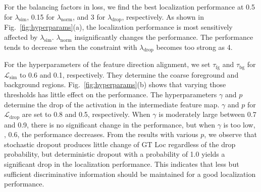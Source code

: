 For the balancing factors in loss, we find the best localization performance at 0.5 for $\lambda_\text{sim}$, 0.15 for $\lambda_\text{norm}$, and 3 for $\lambda_\text{drop}$, respectively.
As shown in Fig.~\ref{fig:hyperparams}(a), the localization performance is most sensitively affected by $\lambda_\text{sim}$. $\lambda_\text{norm}$ insignificantly changes the performance.
The performance tends to decrease when the constraint with $\lambda_\text{drop}$ becomes too strong as 4.


For the hyperparameters of the feature direction alignment, we set $\tau_\text{fg}$ and $\tau_\text{bg}$ for $\mathcal{L}_\text{sim}$ to 0.6 and 0.1, respectively.
They determine the coarse foreground and background regions.
Fig.~\ref{fig:hyperparams}(b) shows that varying those thresholds has little effect on the performance.
The hyperparameters $\gamma$ and $p$ determine the drop of the activation in the intermediate feature map. $\gamma$ and $p$ for $\mathcal{L}_\text{drop}$ are set to 0.8 and 0.5, respectively.
When $\gamma$ is moderately large between 0.7 and 0.9, there is no significant change in the performance, but when $\gamma$ is too low, \ie, 0.6, the performance decreases.
From the results with various $p$, we observe that stochastic dropout produces little change of GT Loc regardless of the drop probability, but deterministic dropout with a probability of 1.0 yields a significant drop in the localization performance. This indicates that less but sufficient discriminative information should be maintained for a good localization performance.